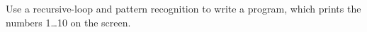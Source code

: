 Use a recursive-loop and pattern recognition to write a program, which prints the numbers 1\dots 10 on the screen.